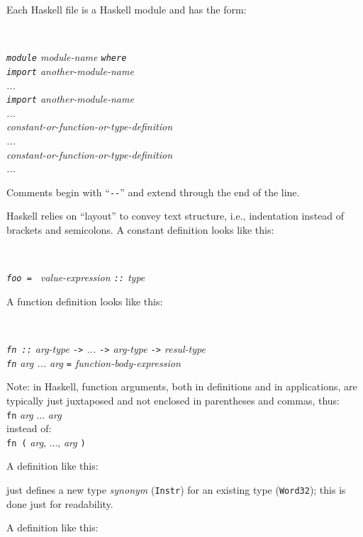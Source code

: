 \documentclass[11pt]{article}
\newcommand{\hmmm}{\hspace*{3em}}
\newcommand{\hmmmm}{\hspace*{4em}}
\begin{document}
Each Haskell file is a Haskell module and has the form:

\hmmmm \
\begin{minipage}[t]{4in}\it
{\tt module} module-name {\tt where} \\
{\tt import} another-module-name \\
... \\
{\tt import} another-module-name \\
... \\
constant-or-function-or-type-definition \\
... \\
constant-or-function-or-type-definition \\
...
\end{minipage}

Comments begin with ``\verb|--|'' and extend through the end of the line.

Haskell relies on ``layout'' to convey text structure, i.e.,
indentation instead of brackets and semicolons. A constant definition
looks like this:

\hmmmm \
\begin{minipage}[t]{4in}\it
{\tt foo = } value-expression {\tt ::} type
\end{minipage}

A function definition looks like this:

\hmmmm \
\begin{minipage}[t]{4in}\it
{\tt fn ::} arg-type {\tt ->} ... {\tt ->} arg-type {\tt ->} resul-type \\
{\tt fn} arg ... arg {\tt  =} function-body-expression
\end{minipage}

Note: in Haskell, function arguments, both in definitions
and in applications, are typically just juxtaposed and not enclosed in
parentheses and commas, thus: \\
\hspace*{2in} {\tt fn} \emph{arg} ... \emph{arg} \\
instead of: \\
\hspace*{2in} {\tt fn (} \emph{arg}, ..., \emph{arg} {\tt )}

A definition like this:

\hmmm {\tt type Instr = Word32}

just defines a new type \emph{synonym} ({\tt Instr}) for an existing type ({\tt Word32});
this is done just for readability.

A definition like this:
\end{document}
